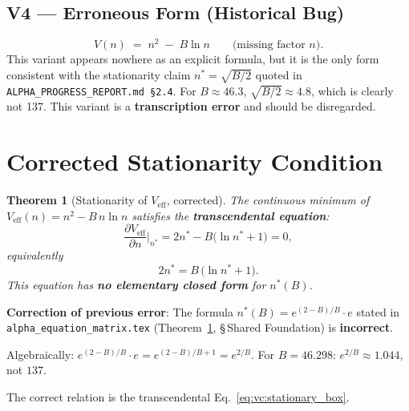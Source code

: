 \documentclass[12pt,a4paper]{article}
\newtheorem{theorem}{Theorem}[section]
\theoremstyle{definition}
\theoremstyle{remark}
\begin{document}
\subsection{V4 — Erroneous Form (Historical Bug)}

\begin{equation}
  V(n) \;=\; n^2 \;-\; B\ln n \qquad \text{(missing factor }n\text{)}.
  \label{eq:vc:Veff_wrong}
\end{equation}
This variant appears nowhere as an explicit formula, but it is the only form
consistent with the stationarity claim $n^* = \sqrt{B/2}$ quoted in
\texttt{ALPHA\_PROGRESS\_REPORT.md~\S2.4}.  For $B \approx 46.3$,
$\sqrt{B/2} \approx 4.8$, which is clearly not 137.
This variant is a \textbf{transcription error} and should be disregarded.

\section{Corrected Stationarity Condition}
\label{sec:vc:stationary}

\begin{theorem}[Stationarity of $V_{\mathrm{eff}}$, corrected]
\label{thm:vc:stationary}
The continuous minimum of $V_{\mathrm{eff}}(n) = n^2 - B\,n\ln n$ satisfies
the \textbf{transcendental equation}:
\begin{equation}
  \frac{\partial V_{\mathrm{eff}}}{\partial n}\bigg|_{n^*}
  = 2n^* - B\bigl(\ln n^* + 1\bigr) = 0,
  \label{eq:vc:stationary}
\end{equation}
equivalently
\begin{equation}
  \boxed{2n^* = B\,\bigl(\ln n^* + 1\bigr).}
  \label{eq:vc:stationary_box}
\end{equation}
This equation has \textbf{no elementary closed form} for $n^*(B)$.
\end{theorem}

\begin{warnbox}
\textbf{Correction of previous error}:
The formula $n^*(B) = e^{(2-B)/B}\cdot e$ stated in
\texttt{alpha\_equation\_matrix.tex} (Theorem~\ref{thm:vc:stationary},
§\,Shared Foundation) is \textbf{incorrect}.

Algebraically: $e^{(2-B)/B}\cdot e = e^{(2-B)/B+1} = e^{2/B}$.
For $B = 46.298$: $e^{2/B} \approx 1.044$, not $137$.

The correct relation is the transcendental Eq.~\eqref{eq:vc:stationary_box}.
\end{warnbox}
\end{document}
